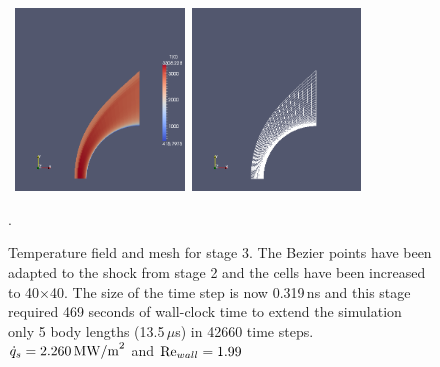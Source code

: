 \begin{figure}[htbp]
\begin{center}
\mbox{
\includegraphics[width=0.4\textwidth]{../2D/sphere-heat-transfer/sphere3-T-field.png}
\includegraphics[width=0.4\textwidth]{../2D/sphere-heat-transfer/sphere3-mesh.png}
}
\end{center}
\caption{Temperature field and mesh for stage 3.
  The Bezier points have been adapted to the shock from stage 2 
  and the cells have been increased to 40$\times$40.
  The size of the time step is now 0.319\,ns and this stage required 469 seconds of wall-clock time
  to extend the simulation only 5 body lengths (13.5\,$\mu$s) in 42660 time steps.
  $\dot{q}_s = 2.260\,{\rm MW/m}^2$ and ${\rm Re}_{wall} =1.99$}.
\label{sphere-heat-transfer-stage-3-fig}
\end{figure}

